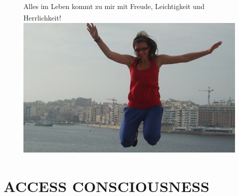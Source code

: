 \documentclass[foldmark,10pt,a4paper,notumble]{leaflet}
\begin{document}
\vspace*{20mm}
\begin{figure}[h!]
 { \large Alles im Leben kommt zu mir mit Freude, Leichtigkeit und Herrlichkeit!\textsuperscript{\textregistered}} 
\includegraphics [scale=.489, angle=270 ]{Bild3.jpg}
\end{figure}





\newpage
\section{ACCESS CONSCIOUSNESS \textsuperscript{\textregistered}}
\end{document}

